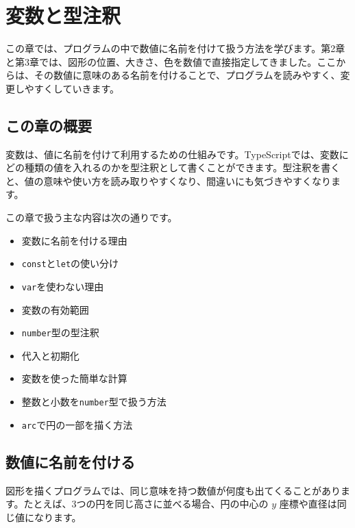 \chapter{変数と型注釈}
\label{chap:variables-and-types}

この章では、プログラムの中で数値に名前を付けて扱う方法を学びます。第2章と第3章では、図形の位置、大きさ、色を数値で直接指定してきました。ここからは、その数値に意味のある名前を付けることで、プログラムを読みやすく、変更しやすくしていきます。

\section{この章の概要}

変数は、値に名前を付けて利用するための仕組みです。TypeScriptでは、変数にどの種類の値を入れるのかを型注釈として書くことができます。型注釈を書くと、値の意味や使い方を読み取りやすくなり、間違いにも気づきやすくなります。

この章で扱う主な内容は次の通りです。

\begin{itemize}
    \item 変数に名前を付ける理由
    \item \texttt{const}と\texttt{let}の使い分け
    \item \texttt{var}を使わない理由
    \item 変数の有効範囲
    \item \texttt{number}型の型注釈
    \item 代入と初期化
    \item 変数を使った簡単な計算
    \item 整数と小数を\texttt{number}型で扱う方法
    \item \texttt{arc}で円の一部を描く方法
\end{itemize}

\section{数値に名前を付ける}

図形を描くプログラムでは、同じ意味を持つ数値が何度も出てくることがあります。たとえば、3つの円を同じ高さに並べる場合、円の中心の $y$ 座標や直径は同じ値になります。

\begin{listing}[htbp]
\inputminted{ts}{typescript-p5/listings/chapter04/constants-for-circles.ts}
\caption{変わらない値に名前を付けて使う（\texttt{chapter04/constants-for-circles.ts}）}
\label{lst:chapter04-constants-for-circles}
\end{listing}

